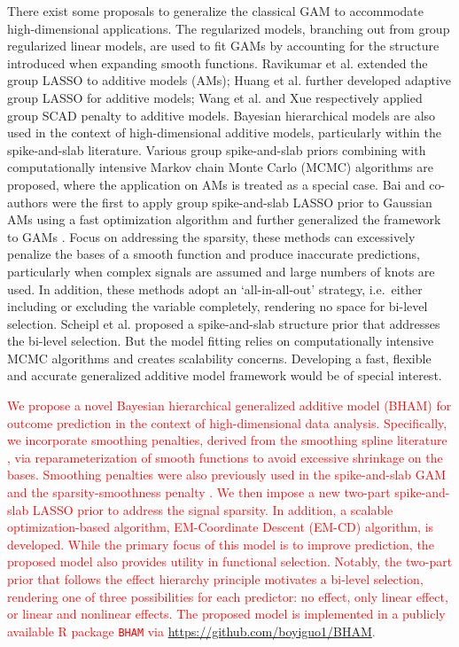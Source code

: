 \documentclass[AMA,STIX1COL,]{WileyNJD-v2}
\begin{document}
There exist some proposals to generalize the classical GAM to
accommodate high-dimensional applications. The regularized models,
branching out from group regularized linear models, are used to fit GAMs
by accounting for the structure introduced when expanding smooth
functions. Ravikumar et al. \citep{Ravikumar2009} extended the group
LASSO \citep{Yuan2006} to additive models (AMs); Huang et al.
\citep{Huang2010} further developed adaptive group LASSO for additive
models; Wang et al. \citep{Wang2007} and Xue \citep{Xue2009}
respectively applied group SCAD penalty \citep{Fan2001} to additive
models. Bayesian hierarchical models are also used in the context of
high-dimensional additive models, particularly within the spike-and-slab
literature. Various group spike-and-slab priors \citep{Xu2015, Yang2020}
combining with computationally intensive Markov chain Monte Carlo (MCMC)
algorithms are proposed, where the application on AMs is treated as a
special case. Bai and co-authors\citep{Bai2020} were the first to apply
group spike-and-slab LASSO prior to Gaussian AMs using a fast
optimization algorithm and further generalized the framework to GAMs
\citep{Bai2021}. Focus on addressing the sparsity, these methods can
excessively penalize the bases of a smooth function and produce
inaccurate predictions, particularly when complex signals are assumed
and large numbers of knots are used. \citep{Scheipl2013} In addition,
these methods adopt an `all-in-all-out' strategy, i.e.~either including
or excluding the variable completely, rendering no space for bi-level
selection. Scheipl et al. \citep{Scheipl2012} proposed a spike-and-slab
structure prior that addresses the bi-level selection. But the model
fitting relies on computationally intensive MCMC algorithms and creates
scalability concerns. Developing a fast, flexible and accurate
generalized additive model framework would be of special interest.

\textcolor{red}{We propose a novel Bayesian hierarchical generalized additive model (BHAM) for outcome prediction in the context of high-dimensional data analysis. Specifically, we incorporate smoothing penalties, derived from the smoothing spline literature \cite{Wood2017}, via reparameterization of smooth functions to avoid excessive shrinkage on the bases. Smoothing penalties were also previously used in the spike-and-slab GAM \cite{Scheipl2012} and the sparsity-smoothness penalty \cite{Meier2009}. We then impose a new two-part spike-and-slab LASSO prior to address the signal sparsity. In addition, a scalable optimization-based algorithm, EM-Coordinate Descent (EM-CD) algorithm, is developed. While the primary focus of this model is to improve prediction, the proposed model also provides utility in functional selection. Notably, the two-part prior that follows the effect hierarchy principle motivates a bi-level selection, rendering one of three possibilities for each predictor: no effect, only linear effect, or linear and nonlinear effects. The proposed model is implemented in a publicly available R package \texttt{BHAM} via \url{https://github.com/boyiguo1/BHAM}.}
\end{document}
